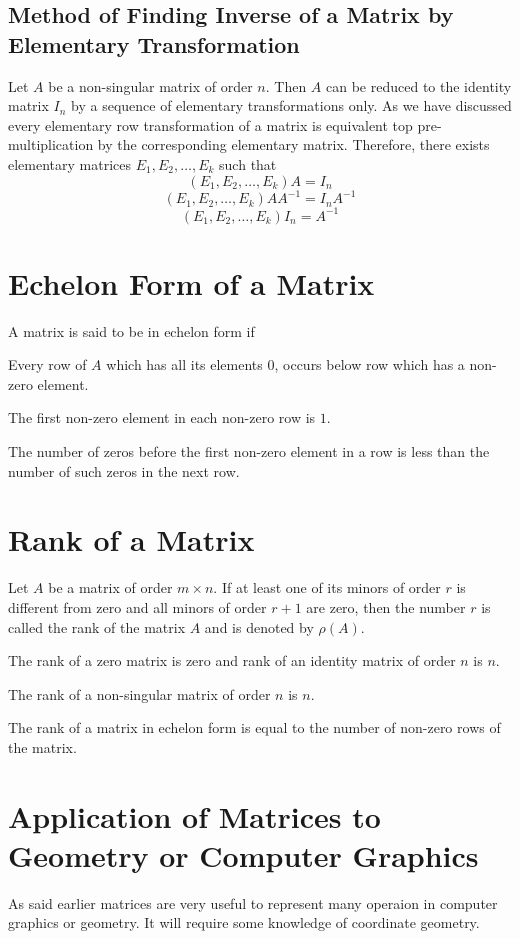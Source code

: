 \subsection{Method of Finding Inverse of a Matrix by Elementary Transformation}
Let $A$ be a non-singular matrix of order $n$. Then $A$ can be reduced to the identity matrix $I_n$ by a sequence of elementary
transformations only. As we have discussed every elementary row transformation of a matrix is equivalent top pre-multiplication by
the corresponding elementary matrix. Therefore, there exists elementary matrices $E_1, E_2,\ldots, E_k$ such that
$$(E_1,E_2,\ldots, E_k)A = I_n$$
$$(E_1,E_2,\ldots, E_k)AA^{-1} = I_nA^{-1}$$
$$(E_1,E_2,\ldots, E_k)I_n = A^{-1}$$

\section{Echelon Form of a Matrix}
A matrix is said to be in echelon form if
\startitemize[n]
\item Every row of $A$ which has all its elements $0$, occurs below row which has a non-zero element.
\item The first non-zero element in each non-zero row is $1$.
\item The number of zeros before the first non-zero element in a row is less than the number of such zeros in the next row.
\stopitemize

\section{Rank of a Matrix}
Let $A$ be a matrix of order $m\times n$. If at least one of its minors of order $r$ is different from zero and all minors of order
$r + 1$ are zero, then the number $r$ is called the rank of the matrix $A$ and is denoted by $\rho(A)$.

\startitemize[n]
\item The rank of a zero matrix is zero and rank of an identity matrix of order $n$ is $n$.
\item The rank of a non-singular matrix of order $n$ is $n$.
\item The rank of a matrix in echelon form is equal to the number of non-zero rows of the matrix.
\stopitemize

\section{Application of Matrices to Geometry or Computer Graphics}
As said earlier matrices are very useful to represent many operaion in computer
graphics or geometry. It will require some knowledge of coordinate geometry.

